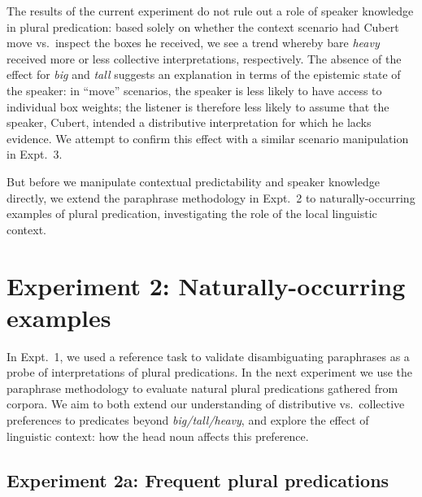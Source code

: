 \documentclass[linguex]{sp}
\begin{document}
The results of the current experiment do not rule out a role of speaker knowledge in plural predication: based solely on whether the context scenario had Cubert move vs.~inspect the boxes he received, we see a trend whereby bare \emph{heavy} received more or less collective interpretations, respectively. The absence of the effect for \emph{big} and \emph{tall} suggests an explanation in terms of the epistemic state of the speaker: in ``move'' scenarios, the speaker is less likely to have access to individual box weights; the listener is therefore less likely to assume that the speaker, Cubert, intended a distributive interpretation for which he lacks evidence. We attempt to confirm this effect with a similar scenario manipulation in Expt.~3.

But before we manipulate contextual predictability and speaker knowledge directly, we extend the paraphrase methodology in Expt.~2 to naturally-occurring examples of plural predication, investigating the role of the local linguistic context.


\section{Experiment 2: Naturally-occurring examples}

In Expt.~1, we used a reference task to validate disambiguating paraphrases as a probe of interpretations of plural predications. 
In the next experiment we use the paraphrase methodology to evaluate natural plural predications gathered from corpora. We aim to both extend our understanding of distributive vs.~collective preferences to predicates beyond \emph{big/tall/heavy}, and explore the effect of linguistic context: how the head noun affects this preference.


\subsection{Experiment 2a: Frequent plural predications}
\end{document}

